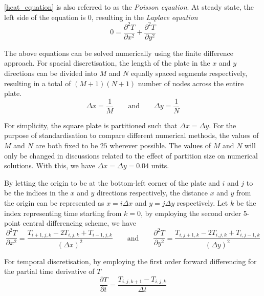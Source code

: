 \documentclass[a4paper]{article}
\begin{document}
		\autoref{heat_equation} is also referred to as the \emph{Poisson equation}. At steady state, the left side of the equation is 0, resulting in the \emph{Laplace equation}
		\begin{equation}
			0 = \frac{\partial^2 T}{\partial x^2} + \frac{\partial^2 T}{\partial y^2}
			\label{laplace_equation}
		\end{equation}
		
		The above equations can be solved numerically using the finite difference approach. For spacial discretisation, the length of the plate in the $x$ and $y$ directions can be divided into $M$ and $N$ equally spaced segments respectively, resulting in a total of $(M+1)(N+1)$ number of nodes across the entire plate.
		\begin{equation*}
			\Delta x = \frac{1}{M} \qquad\text{and}\qquad \Delta y = \frac{1}{N}
		\end{equation*}
		
		For simplicity, the square plate is partitioned such that $\Delta x = \Delta y$. For the purpose of standardisation to compare different numerical methods, the values of $M$ and $N$ are both fixed to be $25$ wherever possible. The values of $M$ and $N$ will only be changed in discussions related to the effect of partition size on numerical solutions. With this, we have $\Delta x = \Delta y = 0.04$ units.
		
		By letting the origin to be at the bottom-left corner of the plate and $i$ and $j$ to be the indices in the $x$ and $y$ directions respectively, the distance $x$ and $y$ from the origin can be represented as $x = i\Delta x$ and $y = j\Delta y$ respectively. Let $k$ be the index representing time starting from $k = 0$, by employing the second order 5-point central differencing scheme, we have
		\begin{equation}
			\frac{\partial^2 T}{\partial x^2}
			= \frac{T_{i+1,j,k} - 2T_{i,j,k} + T_{i-1,j,k}}{(\Delta x)^2}
			\qquad\text{and}\qquad
			\frac{\partial^2 T}{\partial y^2}
			= \frac{T_{i,j+1,k} - 2T_{i,j,k} + T_{i,j-1,k}}{(\Delta y)^2}
			\label{spacial_central_differencing}
		\end{equation}
		
		For temporal discretisation, by employing the first order forward differencing for the partial time derivative of $T$
		\begin{equation}
			\frac{\partial T}{\partial t} = \frac{T_{i,j,k+1} - T_{i,j,k}}{\Delta t}
			\label{time_forward_differencing}
		\end{equation}
		
\end{document}

